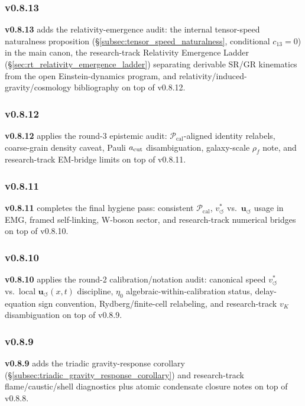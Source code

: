 \documentclass[11pt]{article}
\theoremstyle{definition}
\theoremstyle{plain}
\theoremstyle{remark}
\newcommand{\rhoF}{{\rho_{\!f}}}
\newcommand{\vchar}{v_{\!\boldsymbol{\circlearrowleft}}^{\ast}}
\newcommand{\uswirl}{\mathbf{u}_{\!\boldsymbol{\circlearrowleft}}}
\begin{document}
        \subsubsection{v0.8.13}
            \textbf{v0.8.13} adds the relativity-emergence audit: the internal tensor-speed naturalness proposition (\S\ref{subsec:tensor_speed_naturalness}, conditional $c_{13}=0$) in the main canon, the research-track Relativity Emergence Ladder (\S\ref{sec:rt_relativity_emergence_ladder}) separating derivable SR/GR kinematics from the open Einstein-dynamics program, and relativity/induced-gravity/cosmology bibliography on top of v0.8.12.

        \subsubsection{v0.8.12}
            \textbf{v0.8.12} applies the round-3 epistemic audit: $\mathcal{P}_{\mathrm{cal}}$-aligned identity relabels, coarse-grain density caveat, Pauli $a_{\rm cut}$ disambiguation, galaxy-scale $\rhoF$ note, and research-track EM-bridge limits on top of v0.8.11.

        \subsubsection{v0.8.11}
            \textbf{v0.8.11} completes the final hygiene pass: consistent $\mathcal{P}_{\mathrm{cal}}$, $\vchar$ vs.\ $\uswirl$ usage in EMG, framed self-linking, W-boson sector, and research-track numerical bridges on top of v0.8.10.

        \subsubsection{v0.8.10}
            \textbf{v0.8.10} applies the round-2 calibration/notation audit: canonical speed $\vchar$ vs.\ local $\uswirl(x,t)$ discipline, $\eta_0$ algebraic-within-calibration status, delay-equation sign convention, Rydberg/finite-cell relabeling, and research-track $v_K$ disambiguation on top of v0.8.9.

        \subsubsection{v0.8.9}
            \textbf{v0.8.9} adds the triadic gravity-response corollary (\S\ref{subsec:triadic_gravity_response_corollary}) and research-track flame/caustic/shell diagnostics plus atomic condensate closure notes on top of v0.8.8.
\end{document}
